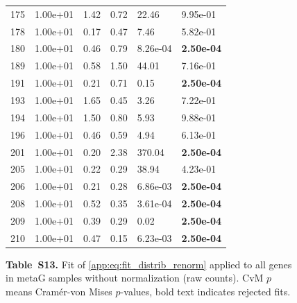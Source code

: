 \begin{figure}[htbp!]
{\begin{minipage}[t]{0.48\linewidth}
\begin{tabular}{llllll}
                    175 & 1.00e+01 & 1.42 & 0.72 & 22.46 & 9.95e-01\\
                    178 & 1.00e+01 & 0.17 & 0.47 & 7.46 & 5.82e-01\\
                    180 & 1.00e+01 & 0.46 & 0.79 & 8.26e-04 & \textbf{2.50e-04}\\
                    189 & 1.00e+01 & 0.58 & 1.50 & 44.01 & 7.16e-01\\
                    191 & 1.00e+01 & 0.21 & 0.71 & 0.15 & \textbf{2.50e-04}\\
                    193 & 1.00e+01 & 1.65 & 0.45 & 3.26 & 7.22e-01\\
                    194 & 1.00e+01 & 1.50 & 0.80 & 5.93 & 9.88e-01\\
                    196 & 1.00e+01 & 0.46 & 0.59 & 4.94 & 6.13e-01\\
                    201 & 1.00e+01 & 0.20 & 2.38 & 370.04 & \textbf{2.50e-04}\\
                    205 & 1.00e+01 & 0.22 & 0.29 & 38.94 & 4.23e-01\\
                    206 & 1.00e+01 & 0.21 & 0.28 & 6.86e-03 & \textbf{2.50e-04}\\
                    208 & 1.00e+01 & 0.52 & 0.35 & 3.61e-04 & \textbf{2.50e-04}\\
                    209 & 1.00e+01 & 0.39 & 0.29 & 0.02 & \textbf{2.50e-04}\\
                    210 & 1.00e+01 & 0.47 & 0.15 & 6.23e-03 & \textbf{2.50e-04}\\
        \bottomrule
        \end{tabular}
    \end{minipage}
    }
    \caption*{\textbf{Table~S13.} Fit of \eqref{app:eq:fit_distrib_renorm} applied to all genes in metaG samples without normalization (raw counts). CvM $p$ means Cram\'er-von Mises $p$-values, bold text indicates rejected fits.}
    \label{subtab:app:all_raw:metaG}
\end{figure}